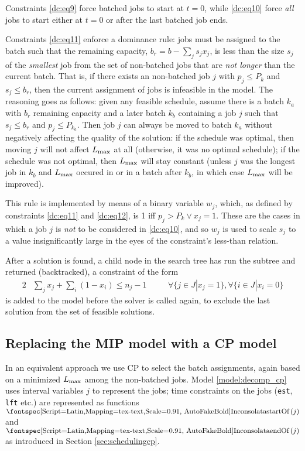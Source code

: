 \documentclass[13pt, letterpaper, oneside]{book}
\begin{document}
Constraints \eqref{dc:eq9} force batched jobs to start at $t = 0$, while
\eqref{dc:eq10} force \textit{all} jobs to start either at $t = 0$ or after the
last batched job ends.

Constraints \eqref{dc:eq11} enforce a dominance rule: jobs must be assigned to
the batch such that the remaining capacity, $b_r = b - \sum_j s_j x_j$, is less
than the size $s_j$ of the \textit{smallest} job from the set of non-batched
jobs that are \textit{not longer} than the current batch. That is, if there
exists an non-batched job $j$ with $p_j \leq P_k$ and $s_j \leq b_r$, then the
current assignment of jobs is infeasible in the model. The reasoning goes as
follows: given any feasible schedule, assume there is a batch $k_a$ with $b_r$
remaining capacity and a later batch $k_b$ containing a job $j$ such that $s_j
\leq b_r$ and $p_j \leq P_{k_a}$. Then job $j$ can always be moved to batch
$k_a$ without negatively affecting the quality of the solution: if the schedule
was optimal, then moving $j$ will not affect $L_{\text{max}}$ at all (otherwise, it was
no optimal schedule); if the schedule was not optimal, then $L_{\text{max}}$ will stay
constant (unless $j$ was the longest job in $k_b$ and $L_{\text{max}}$ occured in or in a
batch after $k_b$, in which case $L_{\text{max}}$ will be improved).

This rule is implemented by means of a binary variable $w_j$, which, as defined
by constraints \eqref{dc:eq11} and \eqref{dc:eq12}, is 1 iff $p_j > P_k \lor x_j
= 1$. These are the cases in which a job $j$ is \textit{not} to be considered in
\eqref{dc:eq10}, and so $w_j$ is used to scale $s_j$ to a value insignificantly
large in the eyes of the constraint's less-than relation.

After a solution is found, a child node in the search tree has run the subtree
and returned (backtracked), a constraint of the form 
\begin{alignat}{2}
& \sum_j x_j + \sum_i (1-x_i) \leq n_j - 1 \quad && \forall \{j \in J | x_j =
1\}, \forall \{i \in J | x_i = 0 \}
\end{alignat}
is added to the model before the solver is called again, to exclude the last
solution from the set of feasible solutions. 

\subsection{Replacing the MIP model with a CP model}\label{sec:cpdecomp}
In an equivalent approach we use CP to select the batch assignments,
again based on a minimized $L_{\text{max}}$ among the non-batched jobs. Model
\ref{model:decomp_cp} uses interval variables $j$ to represent the jobs;
time constraints on the jobs (\texttt{est}, \texttt{lft} etc.) are represented as
functions $\startOf(j)$ and $\endOf(j)$ as introduced in Section
\ref{sec:schedulingcp}.
\end{document}
